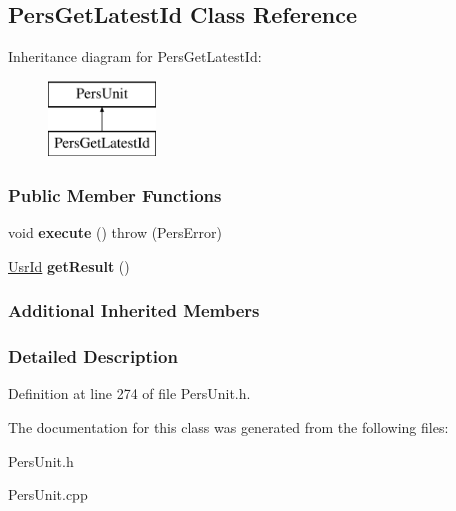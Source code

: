 \hypertarget{classPersGetLatestId}{\subsection{Pers\-Get\-Latest\-Id Class Reference}
\label{d3/dab/classPersGetLatestId}
}
Inheritance diagram for Pers\-Get\-Latest\-Id\-:\begin{figure}[H]
\begin{center}
\leavevmode
\includegraphics[height=2.000000cm]{d3/dab/classPersGetLatestId}
\end{center}
\end{figure}
\subsubsection*{Public Member Functions}
\begin{DoxyCompactItemize}
\item 
\hypertarget{classPersGetLatestId_a11340d0091a1d8bf164011be400609f7}{void {\bfseries execute} ()  throw (\-Pers\-Error)}\label{d3/dab/classPersGetLatestId_a11340d0091a1d8bf164011be400609f7}

\item 
\hypertarget{classPersGetLatestId_a14cee98bf3a6a82d8714ff2e6a601cb5}{\hyperlink{classUsrId}{Usr\-Id} {\bfseries get\-Result} ()}\label{d3/dab/classPersGetLatestId_a14cee98bf3a6a82d8714ff2e6a601cb5}

\end{DoxyCompactItemize}
\subsubsection*{Additional Inherited Members}


\subsubsection{Detailed Description}


Definition at line 274 of file Pers\-Unit.\-h.



The documentation for this class was generated from the following files\-:\begin{DoxyCompactItemize}
\item 
Pers\-Unit.\-h\item 
Pers\-Unit.\-cpp\end{DoxyCompactItemize}
